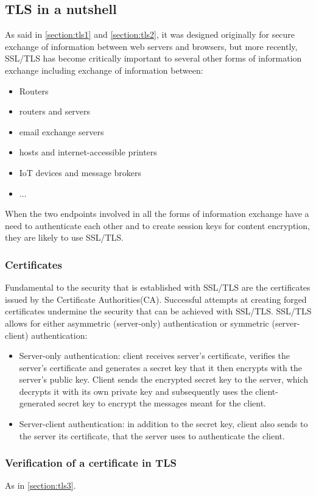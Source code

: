 \documentclass[a4paper, 10pt, titlepage]{article}
\begin{document}
\subsection{TLS in a nutshell}
As said in \ref{section:tls1} and \ref{section:tls2}, it was designed originally for secure exchange of information between web servers and browsers, but more recently, SSL/TLS has become critically important to several other forms of information exchange including exchange of information between:
\begin{itemize}
\item Routers
\item routers and servers
\item email exchange servers
\item hosts and internet-accessible printers
\item IoT devices and message brokers
\item ...
\end{itemize}
When the two endpoints involved in all the forms of information exchange have a need to authenticate each other and to create session keys for content encryption, they are likely to use SSL/TLS.
\subsubsection*{Certificates}
Fundamental to the security that is established with SSL/TLS are the certificates issued by the Certificate Authorities(CA). Successful attempts at creating forged certificates undermine the security that can be achieved with SSL/TLS. SSL/TLS allows for either asymmetric (server-only) authentication or symmetric (server-client) authentication:
\begin{itemize}
\item Server-only authentication: client receives server’s certificate, verifies the server’s certificate and generates a secret key that it then encrypts with the server’s public key. Client sends the encrypted secret key to the server, which decrypts it with its own private key and subsequently uses the client-generated secret key to encrypt the messages meant for the client.
\item Server-client authentication: in addition to the secret key, client also sends to the server its certificate, that the server uses  to authenticate the client.
\end{itemize}

\subsubsection*{Verification of a certificate in TLS}
As in \ref{section:tls3}.
\end{document}
